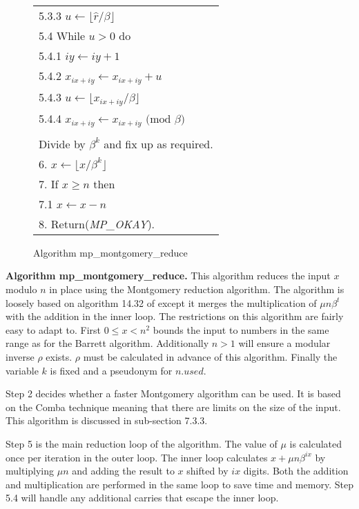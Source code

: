 \documentclass[b5paper]{book}
\begin{document}
\begin{figure}[!here]
\begin{small}
\begin{center}
\begin{tabular}{l}
\hspace{6mm}5.3.3  $u \leftarrow \lfloor \hat r / \beta \rfloor$ \\
\hspace{3mm}5.4  While $u > 0$ do \\
\hspace{6mm}5.4.1  $iy \leftarrow iy + 1$ \\
\hspace{6mm}5.4.2  $x_{ix + iy} \leftarrow x_{ix + iy} + u$ \\
\hspace{6mm}5.4.3  $u \leftarrow \lfloor x_{ix+iy} / \beta \rfloor$ \\
\hspace{6mm}5.4.4  $x_{ix + iy} \leftarrow x_{ix+iy} \mbox{ (mod }\beta\mbox{)}$ \\
\\
Divide by $\beta^k$ and fix up as required. \\
6.  $x \leftarrow \lfloor x / \beta^k \rfloor$ \\
7.  If $x \ge n$ then \\
\hspace{3mm}7.1  $x \leftarrow x - n$ \\
8.  Return(\textit{MP\_OKAY}). \\
\hline
\end{tabular}
\end{center}
\end{small}
\caption{Algorithm mp\_montgomery\_reduce}
\end{figure}

\textbf{Algorithm mp\_montgomery\_reduce.}
This algorithm reduces the input $x$ modulo $n$ in place using the Montgomery reduction algorithm.  The algorithm is loosely based
on algorithm 14.32 of \cite[pp.601]{HAC} except it merges the multiplication of $\mu n \beta^t$ with the addition in the inner loop.  The
restrictions on this algorithm are fairly easy to adapt to.  First $0 \le x < n^2$ bounds the input to numbers in the same range as 
for the Barrett algorithm.  Additionally $n > 1$ will ensure a modular inverse $\rho$ exists.  $\rho$ must be calculated in
advance of this algorithm.  Finally the variable $k$ is fixed and a pseudonym for $n.used$.  

Step 2 decides whether a faster Montgomery algorithm can be used.  It is based on the Comba technique meaning that there are limits on
the size of the input.  This algorithm is discussed in sub-section 7.3.3.

Step 5 is the main reduction loop of the algorithm.  The value of $\mu$ is calculated once per iteration in the outer loop.  The inner loop
calculates $x + \mu n \beta^{ix}$ by multiplying $\mu n$ and adding the result to $x$ shifted by $ix$ digits.  Both the addition and
multiplication are performed in the same loop to save time and memory.  Step 5.4 will handle any additional carries that escape the inner loop.
\end{document}
